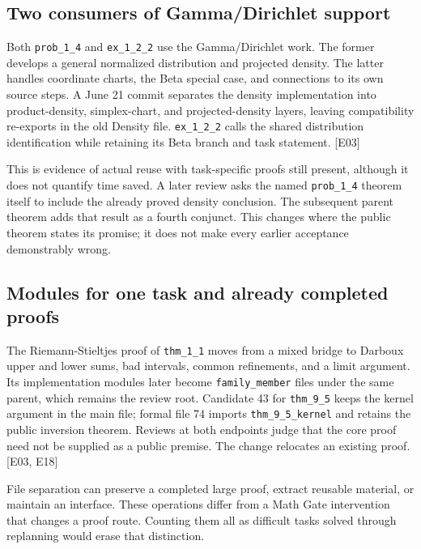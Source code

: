 \subsection[Two consumers of Gamma/Dirichlet support]{\texorpdfstring{\protect\hypertarget{b4}{}Two consumers of Gamma/Dirichlet support}{Two consumers of Gamma/Dirichlet support}}
Both \nolinkurl{prob_1_4} and \nolinkurl{ex_1_2_2} use the Gamma/Dirichlet work. The former develops a general normalized distribution and projected density. The latter handles coordinate charts, the Beta special case, and connections to its own source steps. A June 21 commit separates the density implementation into product-density, simplex-chart, and projected-density layers, leaving compatibility re-exports in the old Density file. \nolinkurl{ex_1_2_2} calls the shared distribution identification while retaining its Beta branch and task statement. [E03]

This is evidence of actual reuse with task-specific proofs still present, although it does not quantify time saved. A later review asks the named \nolinkurl{prob_1_4} theorem itself to include the already proved density conclusion. The subsequent parent theorem adds that result as a fourth conjunct. This changes where the public theorem states its promise; it does not make every earlier acceptance demonstrably wrong.

\subsection[Modules for one task and already completed proofs]{\texorpdfstring{\protect\hypertarget{b5}{}Modules for one task and already completed proofs}{Modules for one task and already completed proofs}}
The Riemann-Stieltjes proof of \nolinkurl{thm_1_1} moves from a mixed bridge to Darboux upper and lower sums, bad intervals, common refinements, and a limit argument. Its implementation modules later become \nolinkurl{family_member} files under the same parent, which remains the review root. Candidate 43 for \nolinkurl{thm_9_5} keeps the kernel argument in the main file; formal file 74 imports \nolinkurl{thm_9_5_kernel} and retains the public inversion theorem. Reviews at both endpoints judge that the core proof need not be supplied as a public premise. The change relocates an existing proof. [E03, E18]

File separation can preserve a completed large proof, extract reusable material, or maintain an interface. These operations differ from a Math Gate intervention that changes a proof route. Counting them all as difficult tasks solved through replanning would erase that distinction.

